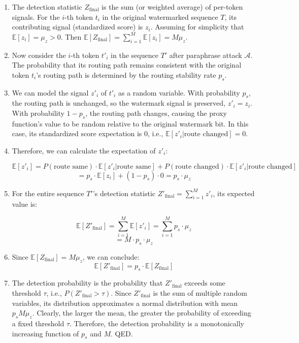 \documentclass[letterpaper,twocolumn,10pt]{article}
\begin{document}
\begin{enumerate}
\item The detection statistic $Z_{\text{final}}$ is the sum (or weighted average) of per-token signals. For the $i$-th token $t_i$ in the original watermarked sequence $T$, its contributing signal (standardized score) is $z_i$. Assuming for simplicity that $\mathbb{E}[z_i] = \mu_z > 0$. Then $\mathbb{E}[Z_{\text{final}}] = \sum_{i=1}^M \mathbb{E}[z_i] = M \mu_z$.

\item Now consider the $i$-th token $t'_i$ in the sequence $T'$ after paraphrase attack $\mathcal{A}$. The probability that its routing path remains consistent with the original token $t_i$'s routing path is determined by the routing stability rate $p_s$.

\item We can model the signal $z'_i$ of $t'_i$ as a random variable. With probability $p_s$, the routing path is unchanged, so the watermark signal is preserved, $z'_i = z_i$. With probability $1-p_s$, the routing path changes, causing the proxy function's value to be random relative to the original watermark bit. In this case, its standardized score expectation is 0, i.e., $\mathbb{E}[z'_i | \text{route changed}] = 0$.

\item Therefore, we can calculate the expectation of $z'_i$:

$$\mathbb{E}[z'_i] = P(\text{route same}) \cdot \mathbb{E}[z'_i | \text{route same}] + P(\text{route changed}) \cdot \mathbb{E}[z'_i | \text{route changed}]$$
$$= p_s \cdot \mathbb{E}[z_i] + (1-p_s) \cdot 0 = p_s \cdot \mu_z$$

\item For the entire sequence $T'$'s detection statistic $Z'_{\text{final}} = \sum_{i=1}^M z'_i$, its expected value is:

$$\mathbb{E}[Z'_{\text{final}}] = \sum_{i=1}^M \mathbb{E}[z'_i] = \sum_{i=1}^M p_s \cdot \mu_z$$
$$= M \cdot p_s \cdot \mu_z$$

\item Since $\mathbb{E}[Z_{\text{final}}] = M \mu_z$, we can conclude:
$$\mathbb{E}[Z'_{\text{final}}] = p_s \cdot \mathbb{E}[Z_{\text{final}}]$$

\item The detection probability is the probability that $Z'_{\text{final}}$ exceeds some threshold $\tau$, i.e., $P(Z'_{\text{final}} > \tau)$. Since $Z'_{\text{final}}$ is the sum of multiple random variables, its distribution approximates a normal distribution with mean $p_s M \mu_z$. Clearly, the larger the mean, the greater the probability of exceeding a fixed threshold $\tau$. Therefore, the detection probability is a monotonically increasing function of $p_s$ and $M$. QED.
\end{enumerate}




\end{document}
